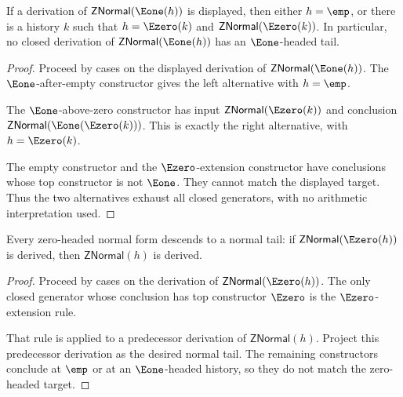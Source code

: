 \begin{theorem}
\label{thm:znormal-adjacent-one-inversion}
If a derivation of $\mathsf{ZNormal}(\Eone(h))$ is displayed, then either
$h=\emp$, or there is a history $k$ such that
$h=\Ezero(k)$ and $\mathsf{ZNormal}(\Ezero(k))$. In particular, no closed
derivation of $\mathsf{ZNormal}(\Eone(h))$ has an $\Eone$-headed tail.
\end{theorem}
\begin{proof}
Proceed by cases on the displayed derivation of
$\mathsf{ZNormal}(\Eone(h))$. The $\Eone$-after-empty constructor gives the
left alternative with $h=\emp$.

The $\Eone$-above-zero constructor has input
$\mathsf{ZNormal}(\Ezero(k))$ and conclusion
$\mathsf{ZNormal}(\Eone(\Ezero(k)))$. This is exactly the right alternative,
with $h=\Ezero(k)$.

The empty constructor and the $\Ezero$-extension constructor have conclusions
whose top constructor is not $\Eone$. They cannot match the displayed target.
Thus the two alternatives exhaust all closed generators, with no arithmetic
interpretation used.
\end{proof}

\begin{theorem}
\label{thm:znormal-zero-extension-inversion}
Every zero-headed normal form descends to a normal tail: if
$\mathsf{ZNormal}(\Ezero(h))$ is derived, then $\mathsf{ZNormal}(h)$ is
derived.
\end{theorem}
\begin{proof}
Proceed by cases on the derivation of $\mathsf{ZNormal}(\Ezero(h))$. The only
closed generator whose conclusion has top constructor $\Ezero$ is the
$\Ezero$-extension rule.

That rule is applied to a predecessor derivation of $\mathsf{ZNormal}(h)$.
Project this predecessor derivation as the desired normal tail. The remaining
constructors conclude at $\emp$ or at an $\Eone$-headed history, so they do
not match the zero-headed target.
\end{proof}

